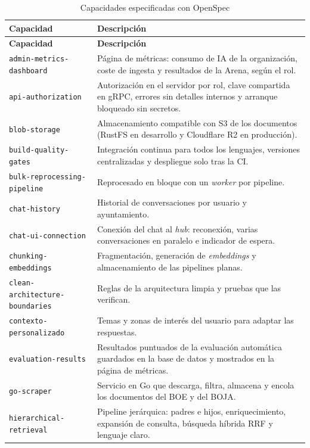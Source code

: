 {\footnotesize
\begin{longtable}{@{}p{} p{}@{}}
\caption{Capacidades especificadas con OpenSpec}\label{tab:capacidades}\\
\toprule
\textbf{Capacidad} & \textbf{Descripción} \\
\midrule
\endfirsthead
\toprule
\textbf{Capacidad} & \textbf{Descripción} \\
\midrule
\endhead
\texttt{admin-metrics-dashboard} & Página de métricas: consumo de IA de la organización, coste de ingesta y resultados de la Arena, según el rol. \\
\texttt{api-authorization} & Autorización en el servidor por rol, clave compartida en gRPC, errores sin detalles internos y arranque bloqueado sin secretos. \\
\texttt{blob-storage} & Almacenamiento compatible con S3 de los documentos (RustFS en desarrollo y Cloudflare R2 en producción). \\
\texttt{build-quality-gates} & Integración continua para todos los lenguajes, versiones centralizadas y despliegue solo tras la CI. \\
\texttt{bulk-reprocessing-pipeline} & Reprocesado en bloque con un \emph{worker} por pipeline. \\
\texttt{chat-history} & Historial de conversaciones por usuario y ayuntamiento. \\
\texttt{chat-ui-connection} & Conexión del chat al \emph{hub}: reconexión, varias conversaciones en paralelo e indicador de espera. \\
\texttt{chunking-embeddings} & Fragmentación, generación de \emph{embeddings} y almacenamiento de las pipelines planas. \\
\texttt{clean-architecture-boundaries} & Reglas de la arquitectura limpia y pruebas que las verifican. \\
\texttt{contexto-personalizado} & Temas y zonas de interés del usuario para adaptar las respuestas. \\
\texttt{evaluation-results} & Resultados puntuados de la evaluación automática guardados en la base de datos y mostrados en la página de métricas. \\
\texttt{go-scraper} & Servicio en Go que descarga, filtra, almacena y encola los documentos del BOE y del BOJA. \\
\texttt{hierarchical-retrieval} & Pipeline jerárquica: padres e hijos, enriquecimiento, expansión de consulta, búsqueda híbrida RRF y lenguaje claro. \\

\end{longtable}}
